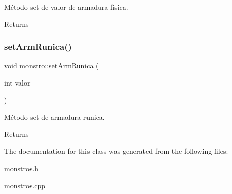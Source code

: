 Método set de valor de armadura física. 

\begin{DoxyReturn}{Returns}

\end{DoxyReturn}
\mbox{\label{classmonstro_a81c11a61a2dc1dc6536b3c3a75947060}} 
\subsubsection{\texorpdfstring{set\+Arm\+Runica()}{setArmRunica()}}
{\footnotesize\ttfamily void monstro\+::set\+Arm\+Runica (\begin{DoxyParamCaption}\item[{int}]{valor }\end{DoxyParamCaption})}



Método set de armadura runica. 

\begin{DoxyReturn}{Returns}

\end{DoxyReturn}


The documentation for this class was generated from the following files\+:\begin{DoxyCompactItemize}
\item 
monstros.\+h\item 
monstros.\+cpp\end{DoxyCompactItemize}
